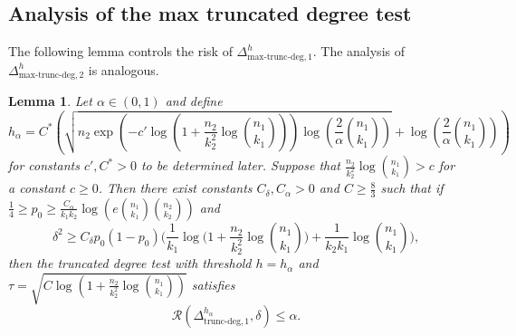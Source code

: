 \documentclass{article}
\newcommand{\cR}{\mathcal{R}}
\newcommand{\chisqlin}{\text{trunc-deg}}
\newcommand{\chisqmax}{\text{max-trunc-deg}}
\newtheorem{lemma}{Lemma}
\begin{document}
\subsection{Analysis of the max truncated degree test}
The following lemma controls the risk of $\Delta^h_{\chisqmax, 1}$. The analysis of $\Delta^h_{\chisqmax, 2}$ is analogous.

\begin{lemma}\label{lem_max_truncated_degree_test}
    Let $\alpha \in (0,1)$ and define 
    $$h_\alpha = C^*\left(\sqrt{n_2\exp\left(-c' \log\left(1 + \frac{n_2}{k_2^2}\log{n_1 \choose k_1}\right)\right)\log\left(\frac{2}{\alpha}{n_1 \choose k_1}\right)} + \log\left(\frac{2}{\alpha}{n_1 \choose k_1}\right)\right)$$ 
    for constants $c', C^* > 0$ to be determined later. Suppose that $\frac{n_2}{k_2^2}\log {n_1 \choose k_1} > c$ for a constant $c \geq 0$. Then there exist constants $C_\delta, C_\alpha > 0$ and $C \geq \frac{8}{3}$ such that if $\frac14 \geq p_0 \geq \frac{C_\alpha}{k_1k_2} \log\left(e{n_1 \choose k_1}{n_2 \choose k_2}\right)$ and
    \[\delta^2 \geq C_\delta p_0(1-p_0)\Bigg(\frac{1}{k_1}\log\Big(1 + \frac{n_2}{k_2^2}\log {n_1 \choose k_1}\Big) + \frac{1}{k_2k_1}\log {n_1 \choose k_1}\Bigg),\]
    then the truncated degree test with threshold $h = h_\alpha$ and $\tau = \sqrt{C\log\left(1 + \frac{n_2}{k_2^2}\log{n_1 \choose k_1}\right)}$ satisfies
    \[\cR(\Delta^{h_\alpha}_{\chisqlin, 1}, \delta) \leq \alpha.\]
\end{lemma}
\end{document}
